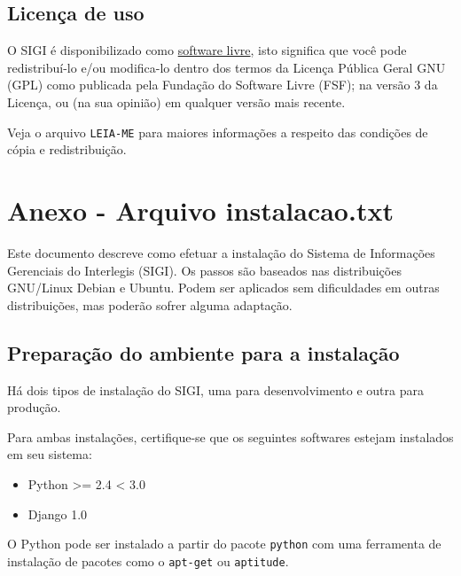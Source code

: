 \hypertarget{licen-a-de-uso}{}
\subsection*{Licença de uso}

O SIGI é disponibilizado como
\href{http://pt.wikipedia.org/wiki/Software_Livre}{software livre},
isto significa que você pode redistribuí-lo e/ou modifica-lo dentro
dos termos da Licença Pública Geral GNU (GPL) como publicada pela
Fundação do Software Livre (FSF); na versão 3 da Licença, ou (na sua
opinião) em qualquer versão mais recente.

Veja o arquivo \texttt{LEIA-ME} para maiores informações a respeito das
condições de cópia e redistribuição.

\section{Anexo - Arquivo instalacao.txt}
\label{sec:a3}
Este documento descreve como efetuar a instalação do Sistema de
Informações Gerenciais do Interlegis (SIGI). Os passos são baseados
nas distribuições GNU/Linux Debian e Ubuntu. Podem ser aplicados sem
dificuldades em outras distribuições, mas poderão sofrer alguma
adaptação.



\hypertarget{prepara-o-do-ambiente-para-a-instala-o}{}
\subsection*{Preparação do ambiente para a instalação}

Há dois tipos de instalação do SIGI, uma para desenvolvimento e outra
para produção.

Para ambas instalações, certifique-se que os seguintes softwares
estejam instalados em seu sistema:
\begin{itemize}
\item {} 
Python {\textgreater}= 2.4 {\textless} 3.0

\item {} 
Django 1.0

\end{itemize}

O Python pode ser instalado a partir do pacote \texttt{python} com uma
ferramenta de instalação de pacotes como o \texttt{apt-get} ou
\texttt{aptitude}.

